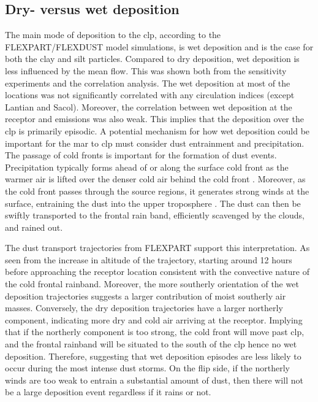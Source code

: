 \subsection{Dry- versus wet deposition}\label{sec:wet_dry_characteristics}
The main mode of deposition to the \acrshort{clp}, according to the FLEXPART/FLEXDUST model simulations, is wet deposition and is the case for both the clay and silt particles. 
Compared to dry deposition, wet deposition is less influenced by the mean flow. This was shown both from the sensitivity experiments and the correlation analysis. 
The wet deposition at most of the locations was not significantly correlated with any circulation indices (except Lantian and Sacol).
Moreover, the correlation between wet deposition at the receptor and emissions was also weak. 
This implies that the deposition over the \acrshort{clp} is primarily episodic. 
A potential mechanism for how wet deposition could be important for the \acrshort{mar} to \acrshort{clp} must consider dust entrainment and precipitation. 
The passage of cold fronts is important for the formation of dust events. 
Precipitation typically forms ahead of or along the surface cold front as the warmer air is lifted over the denser cold air behind the cold front  \parencite{markowski2011mesoscale}. 
Moreover, as the cold front passes through the source regions, it generates strong winds at the surface, entraining the dust into the upper troposphere \parencite{li2015multi}. 
The dust can then be swiftly transported to the frontal rain band, efficiently scavenged by the clouds, and rained out. 

The dust transport trajectories from FLEXPART support this interpretation.
As seen from the increase in altitude of the trajectory, starting around 12 hours before approaching the receptor location consistent with the convective nature of the cold frontal rainband. 
Moreover, the more southerly orientation of the wet deposition trajectories suggests a larger contribution of moist southerly air masses. 
Conversely, the dry deposition trajectories have a larger northerly component, indicating more dry and cold air arriving at the receptor. 
Implying that if the northerly component is too strong, the cold front will move past \acrshort{clp}, and the frontal rainband will be situated to the south of the \acrshort{clp} hence no wet deposition.
Therefore, suggesting that wet deposition episodes are less likely to occur during the most intense dust storms. On the flip side, if the northerly winds are too weak to entrain a substantial amount of dust, then there will not be a large deposition event regardless if it rains or not.

